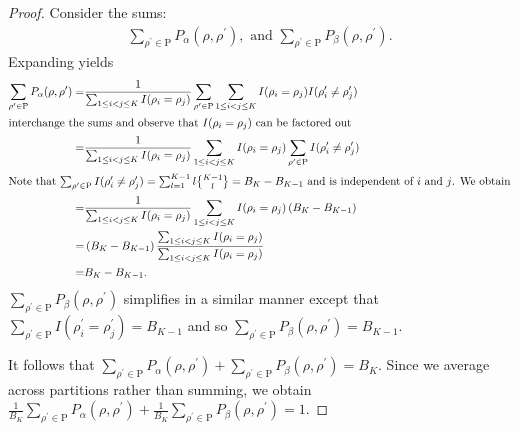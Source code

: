 \documentclass[11pt,a4paper]{article}
\theoremstyle{definition} %
\theoremstyle{case}
\DeclareRobustCommand{\stirling}{\genfrac\{\}{0pt}{}}
\newcommand{\bellnum}[1]{B_{#1}}
\newcommand{\Rho}{\mathrm{P}} %
\begin{document}
\begin{proof}
Consider the sums:
\begin{align}
    \sum_{\rho^\prime\in\Rho} P_\alpha(\rho,\rho^\prime),\text{ and }
    \sum_{\rho^\prime\in\Rho} P_\beta(\rho,\rho^\prime).
\end{align}
Expanding yields
\begin{align}
    \sum_{\rho^\prime\in\Rho} P_\alpha(\rho,\rho^\prime)
    =&\frac{1}{\sum_{1\leq i < j \leq K} I(\rho_i=\rho_j)}\sum_{\rho^\prime\in\Rho} \sum_{1\leq i < j \leq K} I(\rho_i=\rho_j)I(\rho^\prime_i\neq\rho^\prime_j)\\
    \intertext{interchange the sums and observe that $I(\rho_i=\rho_j)$ can be factored out}
    =&\frac{1}{\sum_{1\leq i < j \leq K} I(\rho_i=\rho_j)} \sum_{1\leq i < j \leq K} I(\rho_i=\rho_j)\sum_{\rho^\prime\in\Rho}I(\rho^\prime_i\neq\rho^\prime_j)\\
    \intertext{Note that $\sum_{\rho^\prime\in\Rho}I(\rho^\prime_i\neq\rho^\prime_j) = \sum_{l=1}^{K-1}l\stirling{K-1}{l}= \bellnum{K} - \bellnum{K-1}$ and is independent of $i$ and $j$. %
    We obtain}
    =&\frac{1}{\sum_{1\leq i < j \leq K} I(\rho_i=\rho_j)} \sum_{1\leq i < j \leq K} I(\rho_i=\rho_j)
    \left(\bellnum{K} - \bellnum{K-1}\right)\\
    =&\left(\bellnum{K} - \bellnum{K-1}\right)\frac{\sum_{1\leq i < j \leq K} I(\rho_i=\rho_j)}{\sum_{1\leq i < j \leq K} I(\rho_i=\rho_j)}\\
    =& \bellnum{K} - \bellnum{K-1}.
\end{align}
$\sum_{\rho^\prime\in\Rho} P_\beta(\rho,\rho^\prime)$ simplifies in a similar manner except that $\sum_{\rho^\prime\in\Rho}I(\rho^\prime_i=\rho^\prime_j) = \bellnum{K-1}$ and so $\sum_{\rho^\prime\in\Rho} P_\beta(\rho,\rho^\prime) =\bellnum{K-1}$.

It follows that $\sum_{\rho^\prime\in\Rho} P_\alpha(\rho,\rho^\prime) + \sum_{\rho^\prime\in\Rho} P_\beta(\rho,\rho^\prime) = \bellnum{K}$.
Since we average across partitions rather than summing, we obtain $\frac{1}{\bellnum{K}}\sum_{\rho^\prime\in\Rho} P_\alpha(\rho,\rho^\prime) + \frac{1}{\bellnum{K}}\sum_{\rho^\prime\in\Rho} P_\beta(\rho,\rho^\prime) = 1$.

\end{proof}
\fi
\end{document}
